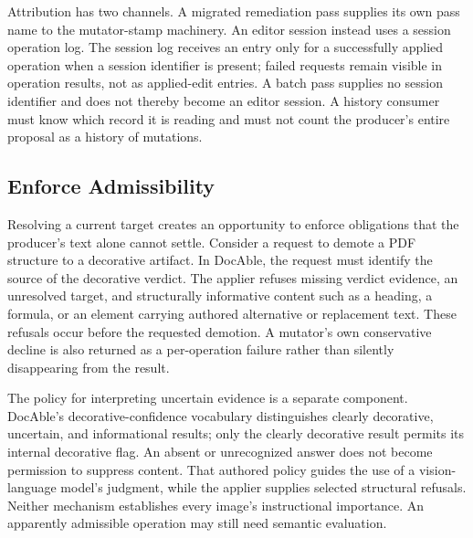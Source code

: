 Attribution has two channels. A migrated remediation pass supplies its own pass name to the mutator-stamp machinery. An editor session instead uses a session operation log. The session log receives an entry only for a successfully applied operation when a session identifier is present; failed requests remain visible in operation results, not as applied-edit entries. A batch pass supplies no session identifier and does not thereby become an editor session. A history consumer must know which record it is reading and must not count the producer's entire proposal as a history of mutations.

\subsection*{Enforce Admissibility}

\label{heading:handbook-model-accessibility-policy}

Resolving a current target creates an opportunity to enforce obligations that the producer's text alone cannot settle. Consider a request to demote a PDF structure to a decorative artifact. In DocAble, the request must identify the source of the decorative verdict. The applier refuses missing verdict evidence, an unresolved target, and structurally informative content such as a heading, a formula, or an element carrying authored alternative or replacement text. These refusals occur before the requested demotion. A mutator's own conservative decline is also returned as a per-operation failure rather than silently disappearing from the result.

The policy for interpreting uncertain evidence is a separate component. DocAble's decorative-confidence vocabulary distinguishes clearly decorative, uncertain, and informational results; only the clearly decorative result permits its internal decorative flag. An absent or unrecognized answer does not become permission to suppress content. That authored policy guides the use of a vision-language model's judgment, while the applier supplies selected structural refusals. Neither mechanism establishes every image's instructional importance. An apparently admissible operation may still need semantic evaluation.

